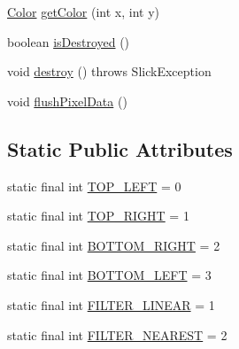 \begin{DoxyCompactItemize}
\item 
\mbox{\hyperlink{classorg_1_1newdawn_1_1slick_1_1_color}{Color}} \mbox{\hyperlink{classorg_1_1newdawn_1_1slick_1_1_image_ab3b87f64ff6c9c413a7f0a016ba0693c}{get\+Color}} (int x, int y)
\item 
boolean \mbox{\hyperlink{classorg_1_1newdawn_1_1slick_1_1_image_aad142bf2d948c1c32750b42f10dc5388}{is\+Destroyed}} ()
\item 
void \mbox{\hyperlink{classorg_1_1newdawn_1_1slick_1_1_image_a416abf7b7608e27ad903388f2b2bfb38}{destroy}} ()  throws Slick\+Exception 
\item 
void \mbox{\hyperlink{classorg_1_1newdawn_1_1slick_1_1_image_ae8ba5dcbbaef48c9ee618f8c68aa1b12}{flush\+Pixel\+Data}} ()
\end{DoxyCompactItemize}
\subsection*{Static Public Attributes}
\begin{DoxyCompactItemize}
\item 
static final int \mbox{\hyperlink{classorg_1_1newdawn_1_1slick_1_1_image_ab914c7bd281e4209e01c5c52c6b5df43}{T\+O\+P\+\_\+\+L\+E\+FT}} = 0
\item 
static final int \mbox{\hyperlink{classorg_1_1newdawn_1_1slick_1_1_image_ac5558f891b01ad616dbb32123f4a15a3}{T\+O\+P\+\_\+\+R\+I\+G\+HT}} = 1
\item 
static final int \mbox{\hyperlink{classorg_1_1newdawn_1_1slick_1_1_image_a8acf96e9e621eb841eceecee23c37ea8}{B\+O\+T\+T\+O\+M\+\_\+\+R\+I\+G\+HT}} = 2
\item 
static final int \mbox{\hyperlink{classorg_1_1newdawn_1_1slick_1_1_image_ad452f046915af13689a5506834a6c2f3}{B\+O\+T\+T\+O\+M\+\_\+\+L\+E\+FT}} = 3
\item 
static final int \mbox{\hyperlink{classorg_1_1newdawn_1_1slick_1_1_image_ad3ba5404a81c4fad40140cbd517fae3d}{F\+I\+L\+T\+E\+R\+\_\+\+L\+I\+N\+E\+AR}} = 1
\item 
static final int \mbox{\hyperlink{classorg_1_1newdawn_1_1slick_1_1_image_ada43983f8d07a25e8f647ce2993dfff7}{F\+I\+L\+T\+E\+R\+\_\+\+N\+E\+A\+R\+E\+ST}} = 2
\end{DoxyCompactItemize}
